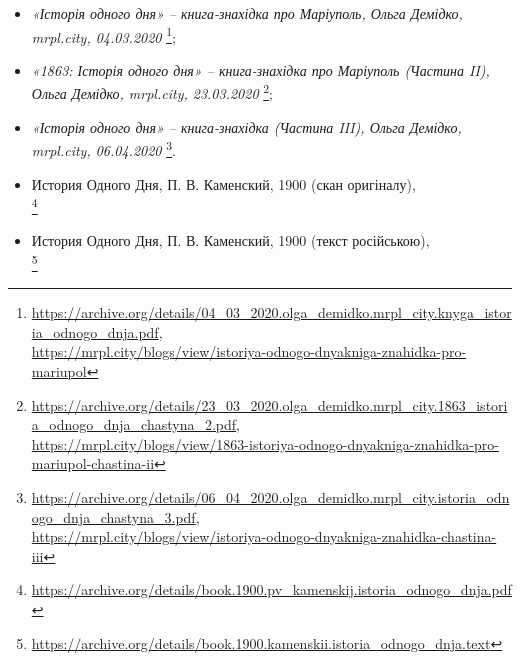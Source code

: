 \documentclass[a4paper,20pt]{report}
\begin{document}
\begin{itemize}
    \item \emph{«Історія одного дня» – книга-знахідка про Маріуполь, Ольга Демідко, mrpl.city, 04.03.2020}
    \footnote{\url{https://archive.org/details/04_03_2020.olga_demidko.mrpl_city.knyga_istoria_odnogo_dnja.pdf},\\
    \url{https://mrpl.city/blogs/view/istoriya-odnogo-dnyakniga-znahidka-pro-mariupol}};

    \item \emph{«1863: Історія одного дня» – книга-знахідка про Маріуполь (Частина II), Ольга Демідко, mrpl.city, 23.03.2020}
    \footnote{\url{https://archive.org/details/23_03_2020.olga_demidko.mrpl_city.1863_istoria_odnogo_dnja_chastyna_2.pdf},\\
                \url{https://mrpl.city/blogs/view/1863-istoriya-odnogo-dnyakniga-znahidka-pro-mariupol-chastina-ii}};

    \item \emph{«Історія одного дня» – книга-знахідка (Частина III), Ольга Демідко, mrpl.city, 06.04.2020}
    \footnote{\url{https://archive.org/details/06_04_2020.olga_demidko.mrpl_city.istoria_odnogo_dnja_chastyna_3.pdf},\\
    \url{https://mrpl.city/blogs/view/istoriya-odnogo-dnyakniga-znahidka-chastina-iii}}.

    \item История Одного Дня, П. В. Каменский, 1900 (скан оригіналу),\\
    \footnote{\url{https://archive.org/details/book.1900.pv_kamenskij.istoria_odnogo_dnja.pdf}}

    \item История Одного Дня, П. В. Каменский, 1900 (текст російською),\\
    \footnote{\url{https://archive.org/details/book.1900.kamenskii.istoria_odnogo_dnja.text}}
    
\end{itemize}

\clearpage

\clearpage


\clearpage


\end{document}
